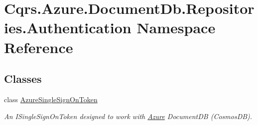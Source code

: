 \hypertarget{namespaceCqrs_1_1Azure_1_1DocumentDb_1_1Repositories_1_1Authentication}{}\section{Cqrs.\+Azure.\+Document\+Db.\+Repositories.\+Authentication Namespace Reference}
\label{namespaceCqrs_1_1Azure_1_1DocumentDb_1_1Repositories_1_1Authentication}
\subsection*{Classes}
\begin{DoxyCompactItemize}
\item 
class \hyperlink{classCqrs_1_1Azure_1_1DocumentDb_1_1Repositories_1_1Authentication_1_1AzureSingleSignOnToken}{Azure\+Single\+Sign\+On\+Token}
\begin{DoxyCompactList}\small\item\em An I\+Single\+Sign\+On\+Token designed to work with \hyperlink{namespaceCqrs_1_1Azure}{Azure} Document\+DB (Cosmos\+DB). \end{DoxyCompactList}\end{DoxyCompactItemize}
